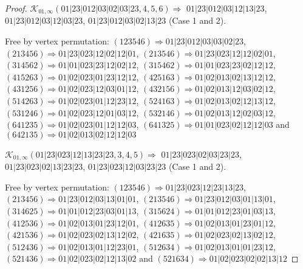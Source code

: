 \documentclass[12pt]{article}
\theoremstyle{plain}
\theoremstyle{definition}
\theoremstyle{remark}
\newcommand{\fancy}[1]{\mathcal{#1}}
\def\K{\fancy{K}}
\begin{document}
\begin{proof}
	
	\bigskip
	
	$\K_{01,\infty}(01|23|012|03|02|03|23,4, 5, 6)\Rightarrow $ $01|23|012|03|12|13|23$, $01|23|012|03|12|03|23$, $01|23|012|03|02|13|23$ (Case 1 and 2).
	
	
	
	Free by vertex permutation: $(1 2 3 5 4 6)\Rightarrow 01|23|012|03|03|02|23$, $(2 1 3 4 5 6)\Rightarrow 01|23|023|12|02|12|01$, $(2 1 3 5 4 6)\Rightarrow 01|23|023|12|12|02|01$, $(3 1 4 5 6 2)\Rightarrow 01|01|023|23|12|02|12$, $(3 1 5 4 6 2)\Rightarrow 01|01|023|23|02|12|12$, $(4 1 5 2 6 3)\Rightarrow 01|02|023|01|23|12|12$, $(4 2 5 1 6 3)\Rightarrow 01|02|013|02|13|12|12$, $(4 3 1 2 5 6)\Rightarrow 01|02|023|12|03|01|12$, $(4 3 2 1 5 6)\Rightarrow 01|02|013|12|03|02|12$, $(5 1 4 2 6 3)\Rightarrow 01|02|023|01|12|23|12$, $(5 2 4 1 6 3)\Rightarrow 01|02|013|02|12|13|12$, $(5 3 1 2 4 6)\Rightarrow 01|02|023|12|01|03|12$, $(5 3 2 1 4 6)\Rightarrow 01|02|013|12|02|03|12$, $(6 4 1 2 3 5)\Rightarrow 01|02|023|01|12|12|03$, $(6 4 1 3 2 5)\Rightarrow 01|01|023|02|12|12|03$ and $(6 4 2 1 3 5)\Rightarrow 01|02|013|02|12|12|03$
	
	
	\bigskip
	
	$\K_{01,\infty}(01|23|023|12|13|23|23,3, 4, 5)\Rightarrow $ $01|23|023|02|03|23|23$, $01|23|023|02|13|23|23$, $01|23|023|12|03|23|23$ (Case 1 and 2).
	
	
	
	Free by vertex permutation: $(1 2 3 5 4 6)\Rightarrow 01|23|023|12|23|13|23$, $(2 1 3 4 5 6)\Rightarrow 01|23|012|03|13|01|01$, $(2 1 3 5 4 6)\Rightarrow 01|23|012|03|01|13|01$, $(3 1 4 6 2 5)\Rightarrow 01|01|012|23|03|01|13$, $(3 1 5 6 2 4)\Rightarrow 01|01|012|23|01|03|13$, $(4 1 2 5 3 6)\Rightarrow 01|02|013|01|23|12|01$, $(4 1 2 6 3 5)\Rightarrow 01|02|013|01|23|01|12$, $(4 2 1 5 3 6)\Rightarrow 01|02|023|02|13|12|02$, $(4 2 1 6 3 5)\Rightarrow 01|02|023|02|13|02|12$, $(5 1 2 4 3 6)\Rightarrow 01|02|013|01|12|23|01$, $(5 1 2 6 3 4)\Rightarrow 01|02|013|01|01|23|12$, $(5 2 1 4 3 6)\Rightarrow 01|02|023|02|12|13|02$ and $(5 2 1 6 3 4)\Rightarrow 01|02|023|02|02|13|12$
	
	
	\bigskip
	

\end{proof}
\end{document}
